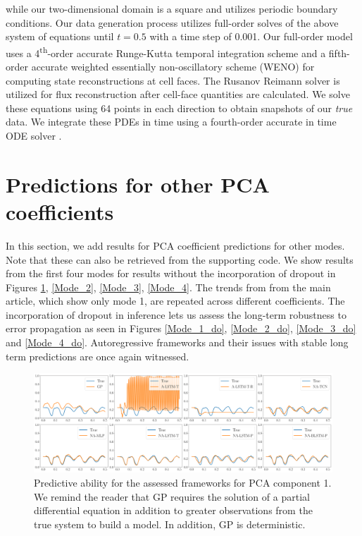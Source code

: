 \documentclass[12pt]{article}
\begin{document}
while our two-dimensional domain is a square and utilizes periodic boundary conditions. Our data generation process utilizes full-order solves of the above system of equations until $t=0.5$ with a time step of 0.001. Our full-order model uses a 4\textsuperscript{th}-order accurate Runge-Kutta temporal integration scheme and a fifth-order accurate weighted essentially non-oscillatory scheme (WENO) \cite{liu1994weighted} for computing state reconstructions at cell faces. The Rusanov Reimann solver is utilized for flux reconstruction after cell-face quantities are calculated. We solve these equations using 64 points in each direction to obtain snapshots of our \emph{true} data. We integrate these PDEs in time using a fourth-order accurate in time ODE solver \cite{hairer1991solving}.


\section{Predictions for other PCA coefficients}

In this section, we add results for PCA coefficient predictions for other modes. Note that these can also be retrieved from the supporting code. We show results from the first four modes for results without the incorporation of dropout in Figures \ref{Mode_1}, \ref{Mode_2}, \ref{Mode_3}, \ref{Mode_4}. The trends from from the main article, which show only mode 1, are repeated across different coefficients. The incorporation of dropout in inference lets us assess the long-term robustness to error propagation as seen in Figures \ref{Mode_1_do}, \ref{Mode_2_do}, \ref{Mode_3_do} and \ref{Mode_4_do}. Autoregressive frameworks and their issues with stable long term predictions are once again witnessed.

\begin{figure}[h!]
    \centering
    \includegraphics[width=\textwidth]{Figure_1.png}
    \caption{Predictive ability for the assessed frameworks for PCA component 1. We remind the reader that GP requires the solution of a partial differential equation in addition to greater observations from the true system to build a model. In addition, GP is deterministic.}
    \label{Mode_1}
\end{figure}
\end{document}
